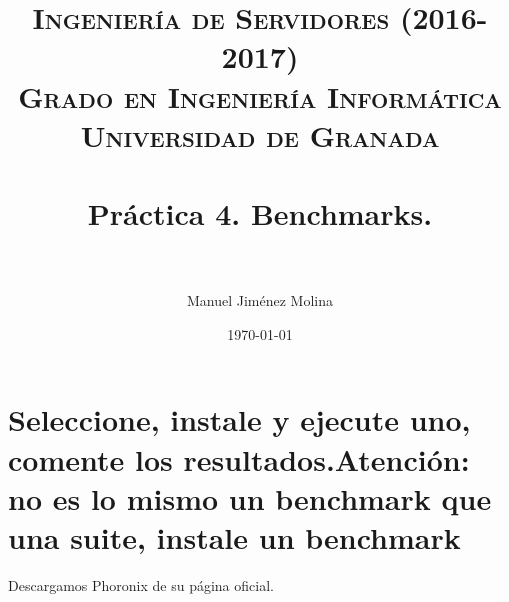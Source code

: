 
\title{	
	\normalfont \normalsize 
	\textsc{{\bf Ingeniería de Servidores (2016-2017)} \\ Grado en Ingeniería Informática \\ Universidad de Granada} \\ [25pt] %
	\horrule{0.5pt} \\[0.4cm] %
	\huge Práctica 4. Benchmarks. \\ %
	\horrule{2pt} \\[0.5cm] %
}

\author{Manuel Jiménez Molina} %

\date{\normalsize\today} %



	
	\maketitle %
	
	\newpage %
	
	\tableofcontents %
	
	\listoffigures
	
	\listoftables
	
	\newpage
	
	
	
	
	
	\newpage
	
	
	\section{Seleccione, instale y ejecute uno, comente los resultados.Atención: no es lo mismo un benchmark que una suite, instale un benchmark}
	
	
	Descargamos Phoronix de su página oficial\cite{ejercicio1-1}.\\
	
